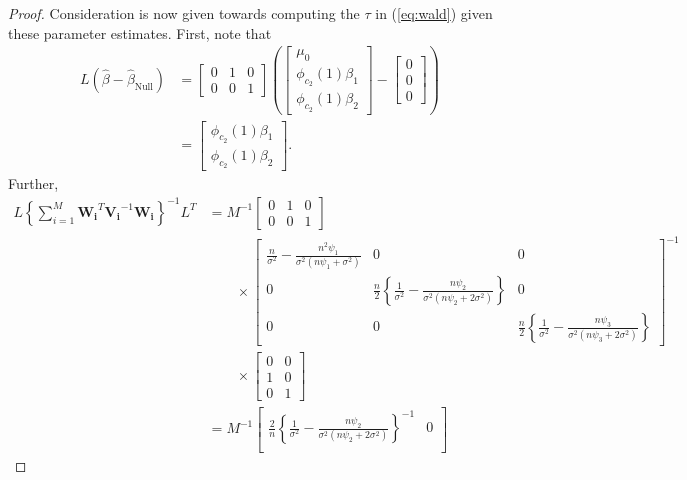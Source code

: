 \begin{proof}
Consideration is now given towards computing the $\tau$ in (\ref{eq:wald}) given these parameter estimates. First, note that
\begin{align*}
L(\hat{\beta} - \hat{\beta}_{\text{Null}}) &= \begin{bmatrix}
        0 & 1 & 0 \\
        0 & 0 & 1
    \end{bmatrix}\left(\begin{bmatrix}
    \mu_0 \\
    \phi_{c_2}(1)\beta_1 \\
    \phi_{c_2}(1)\beta_2
    \end{bmatrix} - \begin{bmatrix}
    0 \\
    0 \\
    0
    \end{bmatrix} \right) \\
    &= \begin{bmatrix}
    \phi_{c_2}(1)\beta_1 \\
    \phi_{c_2}(1)\beta_2
    \end{bmatrix}.
\end{align*}
Further,
\begin{align*}
    L\left\{\sum_{i=1}^M\boldsymbol{W_i}^T\boldsymbol{V_i}^{-1}\boldsymbol{W_i}\right\}^{-1}L^T &= M^{-1}\begin{bmatrix}
        0 & 1 & 0 \\
        0 & 0 & 1
    \end{bmatrix} \\
    & \quad \quad \times \begin{bmatrix}\frac{n}{\sigma^2} - \frac{n^2\psi_1}{\sigma^2(n\psi_1+\sigma^2)} & 0 & 0 \\
    0 & \frac{n}{2}\left\{\frac{1}{\sigma^2} - \frac{n\psi_2}{\sigma^2(n\psi_2+2\sigma^2)}\right\} & 0 \\
    0 & 0 & \frac{n}{2}\left\{\frac{1}{\sigma^2} - \frac{n\psi_3}{\sigma^2(n\psi_3+2\sigma^2)}\right\}  \end{bmatrix}^{-1} \\
    & \quad \quad \times \begin{bmatrix}
        0 & 0 \\
        1 & 0 \\
        0 & 1
    \end{bmatrix} \\
    &= M^{-1}\begin{bmatrix} \frac{2}{n}\left\{\frac{1}{\sigma^2} - \frac{n\psi_2}{\sigma^2(n\psi_2+2\sigma^2)}\right\}^{-1} & 0 \\

\end{bmatrix}
\end{align*}
\end{proof}
